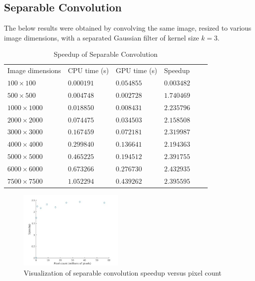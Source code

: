 \documentclass[journal]{IEEEtran}
\begin{document}
\subsection{Separable Convolution}
The below results were obtained by convolving the same image, resized to various image dimensions, with a separated Gaussian filter of kernel size $k = 3$.
\begin{table}[H]
	\small
	\centering
	\caption{Speedup of Separable Convolution}
	\label{separable-convolution-speedup}
	\begin{tabular}{llllll}
	 Image dimensions & CPU time (s) & GPU time (s) & Speedup \\
	 $100 \times 100$ & $0.000191$ & $0.054855$ & $0.003482$ \\
	 $500 \times 500$ & $0.004748$ & $0.002728$ & $1.740469$ \\
	 $1000 \times 1000$ & $0.018850$ & $0.008431$ & $2.235796$ \\
	 $2000 \times 2000$ & $0.074475$ & $0.034503$ & $2.158508$ \\
	 $3000 \times 3000$ & $0.167459$ & $0.072181$ & $2.319987$ \\
	 $4000 \times 4000$ & $0.299840$ & $0.136641$ & $2.194363$ \\
	 $5000 \times 5000$ & $0.465225$ & $0.194512$ & $2.391755$ \\
	 $6000 \times 6000$ & $0.673266$ & $0.276730$ & $2.432935$ \\
	 $7500 \times 7500$ & $1.052294$ & $0.439262$ & $2.395595$ \\
	\end{tabular}
\end{table}
\begin{figure}[h]
	\centering
	\includegraphics[width=0.45\textwidth]{separable_convolution_speedup_graph.jpg}
	\caption{Visualization of separable convolution speedup versus pixel count}
    \label{separable-convolution-speedup-graph}
\end{figure}
\end{document}
